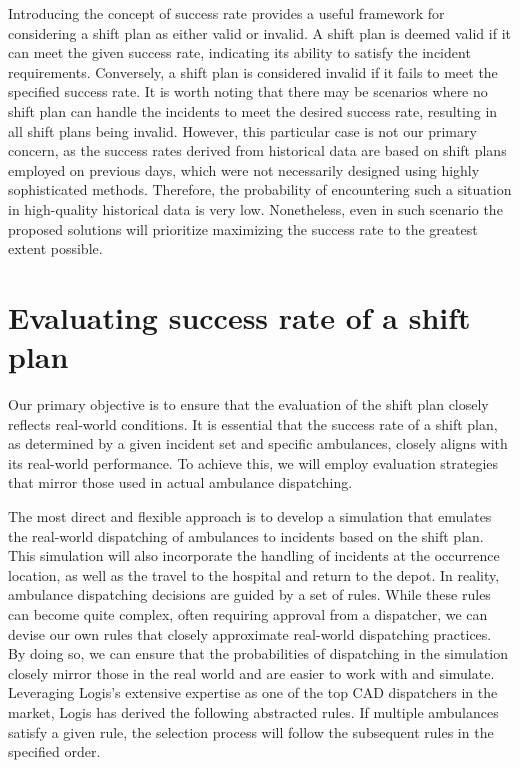 Introducing the concept of success rate provides a useful framework for
considering a shift plan as either valid or invalid. A shift plan is deemed
valid if it can meet the given success rate, indicating its ability to satisfy
the incident requirements. Conversely, a shift plan is considered invalid if it
fails to meet the specified success rate. It is worth noting that there may be
scenarios where no shift plan can handle the incidents to meet the desired
success rate, resulting in all shift plans being invalid. However, this
particular case is not our primary concern, as the success rates derived from
historical data are based on shift plans employed on previous days, which were
not necessarily designed using highly sophisticated methods. Therefore, the
probability of encountering such a situation in high-quality historical data is
very low. Nonetheless, even in such scenario the proposed solutions will
prioritize maximizing the success rate to the greatest extent possible.

\section{Evaluating success rate of a shift plan}

Our primary objective is to ensure that the evaluation of the shift plan
closely reflects real-world conditions. It is essential that the success rate
of a shift plan, as determined by a given incident set and specific ambulances,
closely aligns with its real-world performance. To achieve this, we will employ
evaluation strategies that mirror those used in actual ambulance dispatching.

The most direct and flexible approach is to develop a simulation that emulates
the real-world dispatching of ambulances to incidents based on the shift plan.
This simulation will also incorporate the handling of incidents at the
occurrence location, as well as the travel to the hospital and return to the
depot. In reality, ambulance dispatching decisions are guided by a set of
rules. While these rules can become quite complex, often requiring approval
from a dispatcher, we can devise our own rules that closely approximate
real-world dispatching practices. By doing so, we can ensure that the
probabilities of dispatching in the simulation closely mirror those in the real
world and are easier to work with and simulate. Leveraging Logis's extensive
expertise as one of the top CAD dispatchers in the market, Logis has derived
the following abstracted rules. If multiple ambulances satisfy a given rule,
the selection process will follow the subsequent rules in the specified order.

